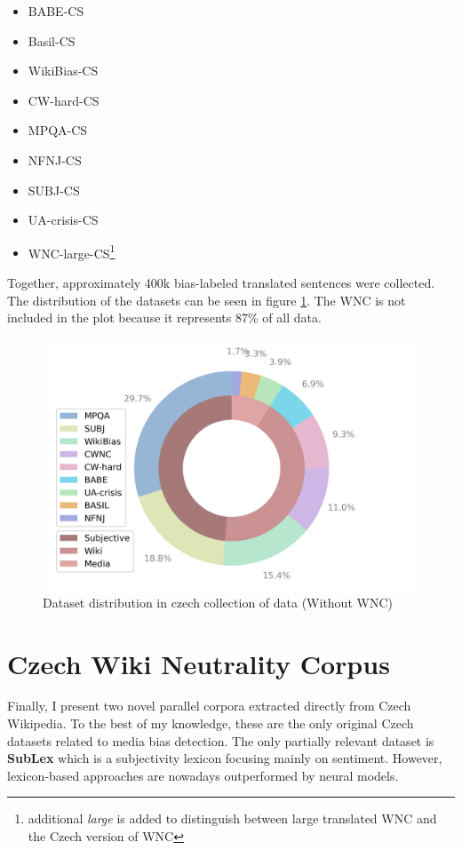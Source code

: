 \begin{itemize}
    \item BABE-CS
    \item Basil-CS
    \item WikiBias-CS
    \item CW-hard-CS
    \item MPQA-CS
    \item NFNJ-CS
    \item SUBJ-CS
    \item UA-crisis-CS
    \item WNC-large-CS\footnote{additional \textit{large} is added to distinguish between large translated WNC and the Czech version of WNC}
\end{itemize}

Together, approximately 400k bias-labeled translated sentences were collected. The distribution of the datasets can be seen in figure \ref{fig:cz_data}. The WNC is not included in the plot because it represents 87\% of all data. 


\begin{figure}[h]
  \includegraphics[scale=0.5]{my_modules/multimedia/pies.png}
  \caption{Dataset distribution in czech collection of data (Without WNC)}
  \label{fig:cz_data}
\end{figure}




\section{Czech Wiki Neutrality Corpus}
Finally, I present two novel parallel corpora extracted directly from Czech Wikipedia. To the best of my knowledge, these are the only original Czech datasets related to media bias detection. The only partially relevant dataset is \textbf{SubLex}\cite{11858/00-097C-0000-0022-FF60-B} which is a subjectivity lexicon focusing mainly on sentiment. However, lexicon-based approaches are nowadays outperformed by neural models.

